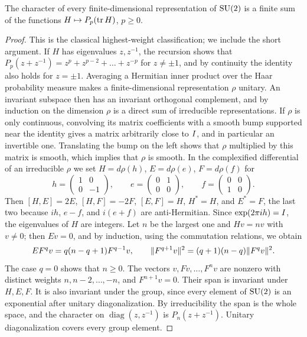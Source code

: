\begin{lemma}\label{ch26:lem:su2-characters}
The character of every finite-dimensional representation of $\mathrm{SU}(2)$ is a finite sum of the functions $H\mapsto P_p(\operatorname{tr} H)$, $p\ge0$.
\end{lemma}

\begin{proof}
This is the classical highest-weight classification; we include the short argument. If $H$ has eigenvalues $z,z^{-1}$, the recursion shows that $P_p(z+z^{-1})=z^p+z^{p-2}+\dots+z^{-p}$ for $z\ne\pm1$, and by continuity the identity also holds for $z=\pm1$. Averaging a Hermitian inner product over the Haar probability measure makes a finite-dimensional representation $\rho$ unitary. An invariant subspace then has an invariant orthogonal complement, and by induction on the dimension $\rho$ is a direct sum of irreducible representations. If $\rho$ is only continuous, convolving its matrix coefficients with a smooth bump supported near the identity gives a matrix arbitrarily close to $I$, and in particular an invertible one. Translating the bump on the left shows that $\rho$ multiplied by this matrix is smooth, which implies that $\rho$ is smooth. In the complexified differential of an irreducible $\rho$ we set $H=d\rho(h)$, $E=d\rho(e)$, $F=d\rho(f)$ for
\[
 h=\begin{pmatrix}1&0\\0&-1\end{pmatrix},\qquad e=\begin{pmatrix}0&1\\0&0\end{pmatrix},\qquad f=\begin{pmatrix}0&0\\1&0\end{pmatrix}.
\]
Then $[H,E]=2E$, $[H,F]=-2F$, $[E,F]=H$, $H^*=H$, and $E^*=F$, the last two because $ih$, $e-f$, and $i(e+f)$ are anti-Hermitian. Since $\exp(2\pi ih)=I$, the eigenvalues of $H$ are integers. Let $n$ be the largest one and $Hv=nv$ with $v\ne0$; then $Ev=0$, and by induction, using the commutation relations, we obtain
\[
 EF^qv=q(n-q+1)F^{q-1}v,\qquad \lVert F^{q+1}v\rVert^2=(q+1)(n-q)\lVert F^qv\rVert^2 .
\]
The case $q=0$ shows that $n\ge0$. The vectors $v,Fv,\dots,F^nv$ are nonzero with distinct weights $n,n-2,\dots,-n$, and $F^{n+1}v=0$. Their span is invariant under $H,E,F$. It is also invariant under the group, since every element of $\mathrm{SU}(2)$ is an exponential after unitary diagonalization. By irreducibility the span is the whole space, and the character on $\operatorname{diag}(z,z^{-1})$ is $P_n(z+z^{-1})$. Unitary diagonalization covers every group element.
\end{proof}

